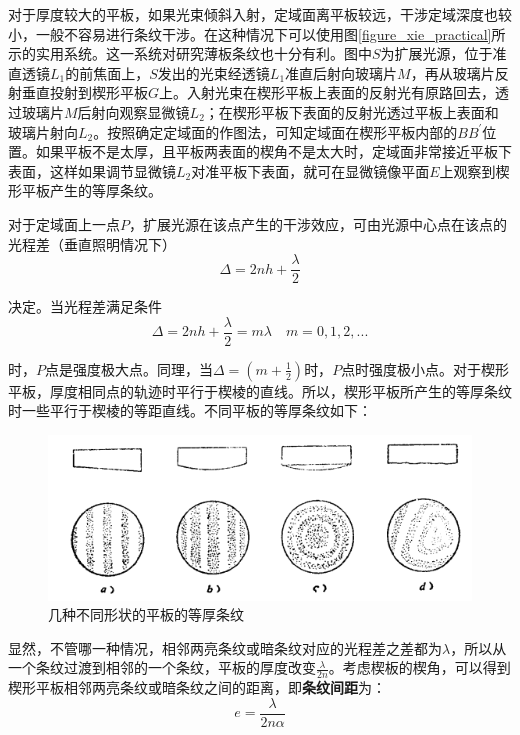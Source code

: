 \documentclass[UTF8]{ctexart}
\begin{document}
	对于厚度较大的平板，如果光束倾斜入射，定域面离平板较远，干涉定域深度也较小，一般不容易进行条纹干涉。在这种情况下可以使用图\ref{figure_xie_practical}所示的实用系统。这一系统对研究薄板条纹也十分有利。图中$ S $为扩展光源，位于准直透镜$ L_{1} $的前焦面上，$ S $发出的光束经透镜$ L_{1} $准直后射向玻璃片$ M $，再从玻璃片反射垂直投射到楔形平板$ G $上。入射光束在楔形平板上表面的反射光有原路回去，透过玻璃片$ M $后射向观察显微镜$ L_{2} $；在楔形平板下表面的反射光透过平板上表面和玻璃片射向$ L_{2} $。按照确定定域面的作图法，可知定域面在楔形平板内部的$ BB^{\prime} $位置。如果平板不是太厚，且平板两表面的楔角不是太大时，定域面非常接近平板下表面，这样如果调节显微镜$ L_{2} $对准平板下表面，就可在显微镜像平面$ E $上观察到楔形平板产生的等厚条纹。
	
	对于定域面上一点$ P $，扩展光源在该点产生的干涉效应，可由光源中心点在该点的光程差（垂直照明情况下）
	\begin{equation}
		\Delta=2nh+\frac{\lambda}{2}
	\end{equation}
	
\noindent 决定。当光程差满足条件
\begin{equation}
	\Delta= 2nh +\frac{\lambda}{2} =m \lambda \quad m=0,1,2,...
\end{equation}

\noindent 时，$ P $点是强度极大点。同理，当$ \Delta=\left(m+\frac{1}{2}\right) $时，$ P $点时强度极小点。对于楔形平板，厚度相同点的轨迹时平行于楔棱的直线。所以，楔形平板所产生的等厚条纹时一些平行于楔棱的等距直线。不同平板的等厚条纹如下：
\begin{figure}[ht]
	\centering
	\includegraphics[width=12cm]{xie_denghou.png}
	\caption{几种不同形状的平板的等厚条纹}
	\label{figure_xie_denghou}
\end{figure}

	显然，不管哪一种情况，相邻两亮条纹或暗条纹对应的光程差之差都为$ \lambda $，所以从一个条纹过渡到相邻的一个条纹，平板的厚度改变$ \frac{\lambda}{2 n} $。考虑楔板的楔角，可以得到楔形平板相邻两亮条纹或暗条纹之间的距离，即\textbf{条纹间距}为：
	\begin{equation}
		e=\frac{\lambda}{2 n \alpha}\label{equ_e}
	\end{equation}
	
\end{document}
